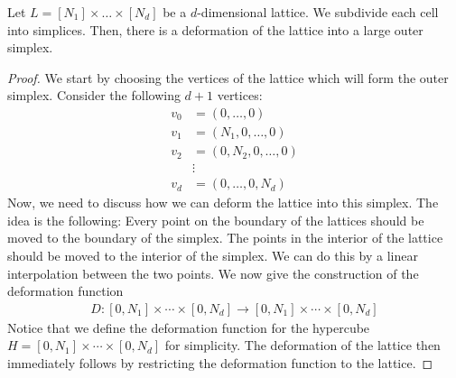 \begin{lemma}
	\label{lem:simplicial_deformation}
	Let $L = [N_1] \times \dots \times [N_d]$ be a $d$-dimensional lattice. We subdivide each cell into simplices. Then, there is a deformation of the lattice into a large outer simplex.
\end{lemma}
\begin{proof}
	We start by choosing the vertices of the lattice which will form the outer simplex. Consider the following $d+1$ vertices:
	\begin{align*}
		v_0 & = (0, \dots, 0)         \\
		v_1 & = (N_1, 0, \dots, 0)    \\
		v_2 & = (0, N_2, 0, \dots, 0) \\
		    & \vdots                  \\
		v_d & = (0, \dots, 0, N_d)
	\end{align*}
	Now, we need to discuss how we can deform the lattice into this simplex. The idea is the following: Every point on the boundary of the lattices should be moved to the boundary of the simplex. The points in the interior of the lattice should be moved to the interior of the simplex. We can do this by a linear interpolation between the two points. We now give the construction of the deformation function 
    \begin{align*}
         D : [0, N_1] \times \cdots \times [0, N_d] \rightarrow [0, N_1] \times \cdots \times [0, N_d]
    \end{align*}
    Notice that we define the deformation function for the hypercube $H = [0, N_1] \times \cdots \times [0, N_d]$ for simplicity. The deformation of the lattice then immediately follows by restricting the deformation function to the lattice.


\end{proof}
